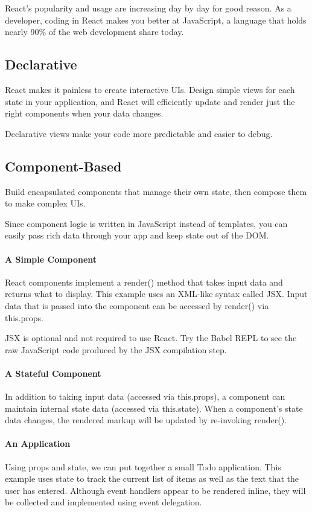 \documentclass{report}
\begin{document}
React's popularity and usage are increasing day by day for good reason. As a developer, coding in React makes you better at JavaScript, a language that holds nearly 90\% of the web development share today.

\subsection{Declarative}
React makes it painless to create interactive UIs. Design simple views for each state in your application, and React will efficiently update and render just the right components when your data changes.

Declarative views make your code more predictable and easier to debug.
\subsection{Component-Based}
Build encapsulated components that manage their own state, then compose them to make complex UIs.

Since component logic is written in JavaScript instead of templates, you can easily pass rich data through your app and keep state out of the DOM.

\paragraph{A Simple Component}
React components implement a render() method that takes input data and returns what to display. This example uses an XML-like syntax called JSX. Input data that is passed into the component can be accessed by render() via this.props.

JSX is optional and not required to use React. Try the Babel REPL to see the raw JavaScript code produced by the JSX compilation step.

\paragraph{A Stateful Component}
In addition to taking input data (accessed via this.props), a component can maintain internal state data (accessed via this.state). When a component’s state data changes, the rendered markup will be updated by re-invoking render().


\paragraph{An Application}
Using props and state, we can put together a small Todo application. This example uses state to track the current list of items as well as the text that the user has entered. Although event handlers appear to be rendered inline, they will be collected and implemented using event delegation.
\end{document}
